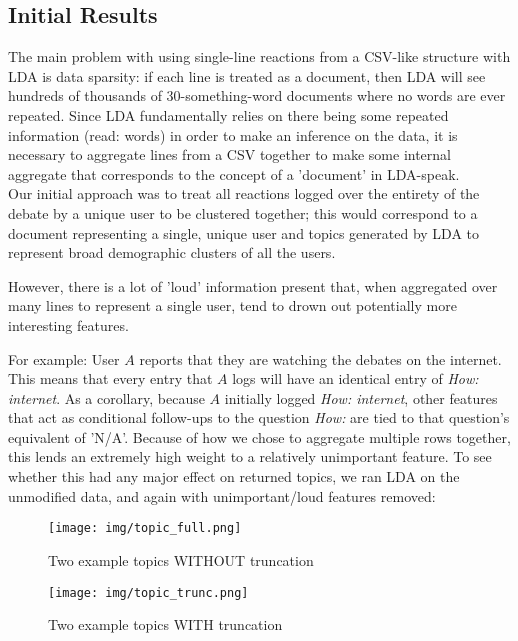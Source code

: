 \subsection{Initial Results}
The main problem with using single-line reactions from a CSV-like structure with LDA is data sparsity: if each line is treated as a document, then LDA will see hundreds of thousands of 30-something-word documents where no words are ever repeated. Since LDA fundamentally relies on there being some repeated information (read: words) in order to make an inference on the data, it is necessary to aggregate lines from a CSV together to make some internal aggregate that corresponds to the concept of a 'document' in LDA-speak.\\

Our initial approach was to treat all reactions logged over the entirety of the debate by a unique user to be clustered together; this would correspond to a document representing a single, unique user and topics generated by LDA to represent broad demographic clusters of all the users.

However, there is a lot of 'loud' information present that, when aggregated over many lines to represent a single user, tend to drown out potentially more interesting features.

For example: User $A$ reports that they are watching the debates on the internet. This means that every entry that $A$ logs will have an identical entry of \emph{How: internet}. As a corollary, because $A$ initially logged \emph{How: internet}, other features that act as conditional follow-ups to the question \emph{How: } are tied to that question's equivalent of 'N/A'. Because of how we chose to aggregate multiple rows together, this lends an extremely high weight to a relatively unimportant feature. To see whether this had any major effect on returned topics, we ran LDA on the unmodified data, and again with unimportant/loud features removed:\\

\begin{figure}
\centering
\texttt{[image: img/topic\_full.png]}
\caption{Two example topics WITHOUT truncation}
\texttt{[image: img/topic\_trunc.png]}
\caption{Two example topics WITH truncation}
\end{figure}


